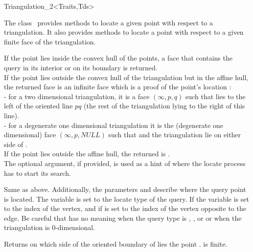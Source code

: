 \begin{ccRefClass}{Triangulation_2<Traits,Tds>}

The class \ccRefName\  provides methods to locate
a given point with respect to a triangulation. It also provides
methods to locate a point with respect to
a given  finite face of the triangulation.

{If the point  lies inside the convex hull of the points, a face 
that contains the query in its interior or on its
 boundary is returned.\\
If the point  lies outside the convex hull of the
triangulation but in the affine hull,
the returned face is an infinite face which is a proof of the point's
location : \\
- for a two dimensional triangulation, it is a face $(\infty, p, q)$ 
such that
 lies to the left  of the oriented line $pq$ 
(the rest of the triangulation lying to the right of this line).\\
- for a degenerate one dimensional triangulation it is the (degenerate
one dimensional) face $(\infty, p, NULL)$ such that 
and the triangulation lie on either side of . \\
If the point  lies outside the affine hull,
the returned  is . \\
The optional  argument, if provided, is used as a hint
of where the locate process has to start its search.}

{Same as above. Additionally, the parameters 
 and 
describe where the query point is located. 
The variable  is set to the locate type of the query.
If  
the variable 
is set to the index of the vertex, and if 
is set to the index 
of the vertex opposite to the
edge. 
Be careful that 
has no meaning when the query type is , , 
or  or when the
triangulation is $0$-dimensional.}

{Returns on which side of the oriented boundary of  lies 
the point . \ccPrecond {} is finite.}


\end{ccRefClass}
